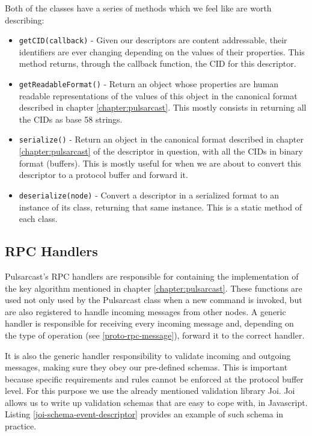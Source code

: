 Both of the classes have a series of methods which we feel like are worth describing:

\begin{itemize}
  \item
    \verb|getCID(callback)| - Given our descriptors are content addressable, their identifiers are ever changing depending on the values of their properties. This method returns, through the callback function, the CID for this descriptor.
  \item
    \verb|getReadableFormat()| - Return an object whose properties are human readable representations of the values of this object in the canonical format described in chapter \ref{chapter:pulsarcast}. This mostly consists in returning all the CIDs as base 58 strings.
  \item
    \verb|serialize()| - Return an object in the canonical format described in chapter \ref{chapter:pulsarcast} of the descriptor in question, with all the CIDs in binary format (buffers). This is mostly useful for when we are about to convert this descriptor to a protocol buffer and forward it.
  \item
    \verb|deserialize(node)| - Convert a descriptor in a serialized format to an instance of its class, returning that same instance. This is a static method of each class.
\end{itemize}

\subsection{RPC Handlers}\label{subsec:rpc-handlers}

Pulsarcast's RPC handlers are responsible for containing the implementation of
the key algorithm mentioned in chapter \ref{chapter:pulsarcast}. These
functions are used not only used by the Pulsarcast class when a new command is
invoked, but are also registered to handle incoming messages from other nodes.
A generic handler is responsible for receiving every incoming message and,
depending on the type of operation (see \ref{proto-rpc-message}), forward it to
the correct handler.

It is also the generic handler responsibility to validate incoming and outgoing
messages, making sure they obey our pre-defined schemas. This is important
because specific requirements and rules cannot be enforced at the protocol
buffer level. For this purpose we use the already mentioned validation library
Joi. Joi allows us to write up validation schemas that are easy to cope with,
in Javascript. Listing \ref{joi-schema-event-descriptor} provides an example of such schema in practice.

